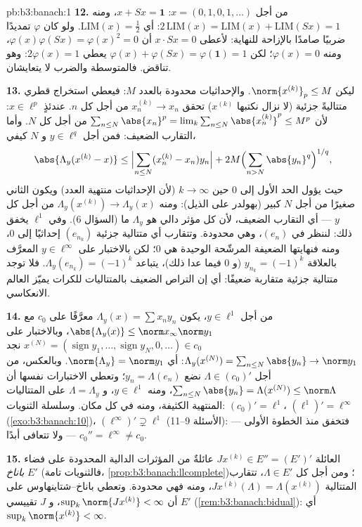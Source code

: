 \begin{solution}{pb:b3:banach:1}
\textbf{12.} من أجل $x = (0,1,0,1,\dots)$: $x + Sx = \mathbf 1$، ومنه $2\,\mathrm{LIM}(x) = \mathrm{LIM}(x) + \mathrm{LIM}(Sx) =
1$: أي $\mathrm{LIM}(x) = \frac12$.
ولو كان $\varphi$ تمديدًا ضربيًا صامدًا بالإزاحة للنهاية: لأعطى
$x\cdot
Sx = 0$ أن $\varphi(x)\varphi(Sx) = \varphi(x)^2 = 0$، ومنه $\varphi(x) = 0$؛ لكن $\varphi(x) + \varphi(Sx) =
\varphi(\mathbf 1) = 1$ يعطي
$2\varphi(x) = 1$: وهو تناقض. فالمتوسطة والضرب لا يتعايشان.

\textbf{13.} ليكن $\norm{x^{(k)}}_p \leq M$. والإحداثيات محدودة بالعدد $M$:
فيعطي استخراج قطري متتاليةً جزئية (لا نزال نكتبها $x^{(k)}$)
تحقق $x^{(k)}_n \to x_n$ من أجل كل $n$. عندئذٍ $x \in \ell^p$: لأن $\sum_{n\leq N}\abs{x_n}^p =
\lim_k\sum_{n\leq N}\abs{x^{(k)}_n}^p \leq M^p$
من أجل كل $N$. وأما التقارب الضعيف: فمن أجل $y \in \ell^q$
و $N$ كيفي،
\[
\abs{\Lambda_y(x^{(k)} - x)} \leq
\Bigl|\sum_{n \leq N}(x^{(k)}_n - x_n)y_n\Bigr|
+ 2M\Bigl(\sum_{n>N}\abs{y_n}^q\Bigr)^{1/q},
\]
حيث يؤول الحد الأول إلى $0$ حين $k \to \infty$ (لأن الإحداثيات
منتهية العدد) ويكون الثاني صغيرًا من أجل $N$ كبير (بهولدر على
الذيل): ومنه $\Lambda_y(x^{(k)}) \to \Lambda_y(x)$ من أجل كل $y$ --- أي التقارب الضعيف، لأن
كل مؤثر دالي هو $\Lambda_y$ ما (السؤال 6). وفي $\ell^1$ يخفق
ذلك: لننظر في $(e_n)$، وهي محدودة. وتتقارب أي متتالية جزئية
$(e_{n_k})$ إحداثيًا إلى $0$، ومنه فنهايتها الضعيفة المرشّحة
الوحيدة هي $0$؛ لكن بالاختبار على $y \in \ell^\infty$ المعرَّف بالعلاقة $y_{n_k} =
(-1)^k$
(و $0$ فيما عدا ذلك)، يتباعد $\Lambda_y(e_{n_k}) = (-1)^k$. فلا توجد متتالية جزئية
متقاربة ضعيفًا: أي إن التراص الضعيف بالمتتاليات للكرات يميّز
العالم الانعكاسي.

\textbf{14.} من أجل $y \in \ell^1$، يكون $\Lambda_y(x) = \sum x_ny_n$ معرَّفًا على
$c_0$ مع $\abs{\Lambda_y(x)} \leq \norm
x_\infty\norm y_1$، وبالاختبار على $x^{(N)} =
(\operatorname{sign}y_1, \dots, \operatorname{sign}y_N, 0,
\dots) \in c_0$ نجد $\Lambda_y(x^{(N)}) =
\sum_{n\leq N}\abs{y_n} \to \norm y_1$: أي
$\norm{\Lambda_y} = \norm y_1$. وبالعكس، من أجل $\Lambda \in
(c_0)'$ نضع $y_n = \Lambda(e_n)$؛ وتعطي الاختبارات
نفسها أن $\sum_{n \leq N}\abs{y_n} = \Lambda(x^{(N)}) \leq
\norm\Lambda$، ومنه $y \in \ell^1$، و $\Lambda = \Lambda_y$ على المتتاليات
المنتهية الكثيفة، ومنه في كل مكان. وسلسلة الثنويات: $(c_0)' = \ell^1$،
$(\ell^1)' = \ell^\infty$ (\cref{exo:b3:banach:10})، $(\ell^\infty)' \supsetneq \ell^1$ (الأسئلة 9--11): فتخفق 
منذ الخطوة الأولى --- $c_0'' = \ell^\infty \neq c_0$ --- ولا تتعافى أبدًا.

\textbf{15.} العائلة $J x^{(k)} \in E'' = (E')'$ عائلةٌ من المؤثرات الدالية
المحدودة على فضاء \emph{باناخ} $E'$ (فالثنويات تامة،
\cref{prop:b3:banach:llcomplete})؛ ومن أجل كل $\Lambda \in E'$، تتقارب المتتالية
$Jx^{(k)}(\Lambda) =
\Lambda(x^{(k)})$، ومنه فهي محدودة. وتعطي باناخ--شتاينهاوس على $E'$ أن
$\sup_k\norm{Jx^{(k)}} <
\infty$، و $J$ تقييسي (\cref{rem:b3:banach:bidual}): أي $\sup_k\norm{x^{(k)}} <
\infty$.


\end{solution}
